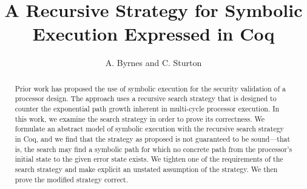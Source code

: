 \documentclass[runningheads]{llncs}
\begin{document}
\title{A Recursive Strategy for Symbolic Execution Expressed in Coq}
\author{A. Byrnes and C. Sturton}




\maketitle

\begin{abstract}
Prior work has proposed the use of symbolic execution for the security
validation of a processor design. The approach uses a recursive search strategy
that is designed to counter the exponential path growth inherent in multi-cycle
processor execution. In this work, we examine the search strategy in order to
prove its correctness. We formulate an abstract model of symbolic execution with
the recursive search strategy in Coq, and we find that the
strategy as proposed is not guaranteed to be sound---that is, the
search may find a symbolic path for which no concrete path from the processor's initial state
to the given error state exists. We tighten one of the requirements of the
search strategy and make explicit an unstated assumption of the strategy. We then prove the modified strategy correct. 
\end{abstract}










%




\end{document}
